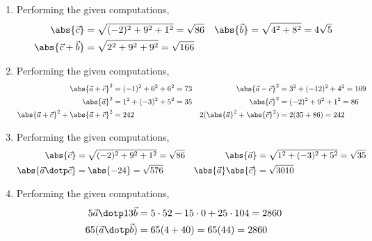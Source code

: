 \begin{enumerate}
      \item Performing the given computations,
            \begin{align}
                  \abs{\vec{c}}           & = \sqrt{(-2)^2 + 9^2 + 1^2} = \sqrt{86} &
                  \abs{\vec{b}}           & = \sqrt{4^2 + 8^2} = 4\sqrt{5}            \\
                  \abs{\vec{c} + \vec{b}} &
                  = \sqrt{2^2 + 9^2 + 9^2} = \sqrt{166}
            \end{align}

      \item Performing the given computations,
            \begin{align}
                  \abs{\vec{a} + \vec{c}}^2            & = (-1)^2 + 6^2 + 6^2 = 73   &
                  \abs{\vec{a} - \vec{c}}^2            & = 3^2 + (-12)^2 + 4^2 = 169   \\
                  \abs{\vec{a}}^2                      & = 1^2 + (-3)^2 + 5^2 = 35   &
                  \abs{\vec{c}}^2                      & = (-2)^2 + 9^2 + 1^2 = 86     \\
                  \abs{\vec{a} + \vec{c}}^2
                  + \abs{\vec{a} + \vec{c}}^2          & = 242                       &
                  2(\abs{\vec{a}}^2 + \abs{\vec{c}}^2) & = 2(35 + 86) = 242
            \end{align}

      \item Performing the given computations,
            \begin{align}
                  \abs{\vec{c}}               & = \sqrt{(-2)^2 + 9^2 + 1^2}
                  = \sqrt{86}                 &
                  \abs{\vec{a}}               & = \sqrt{1^2 + (-3)^2 + 5^2}
                  = \sqrt{35}                                                 \\
                  \abs{\vec{a}
                  \dotp \vec{c}}              & = \abs{-24} = \sqrt{576}    &
                  \abs{\vec{a}} \abs{\vec{c}} & = \sqrt{3010}
            \end{align}

      \item Performing the given computations,
            \begin{align}
                  5\vec{a} \dotp 13\vec{b}   & = 5 \cdot 52 - 15 \cdot 0 + 25 \cdot 104
                  = 2860                                                                \\
                  65 (\vec{a} \dotp \vec{b}) & = 65 (4 + 40) = 65(44) = 2860
            \end{align}


\end{enumerate}
